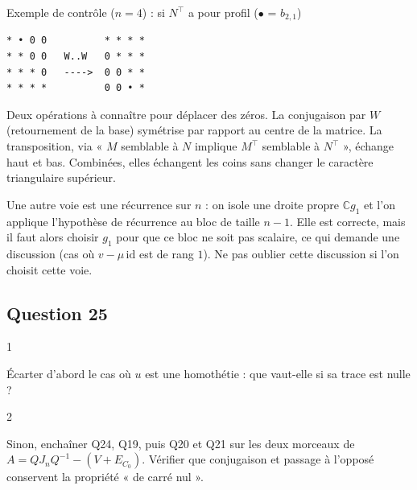 \documentclass[11pt,a4paper]{article}
\begin{document}
Exemple de contrôle (\(n=4\)) : si \(N^\top\) a pour profil (\(\bullet\) = \(b_{2,1}\))

\begin{lstlisting}
* • 0 0          * * * *
* * 0 0   W..W   0 * * *
* * * 0   ---->  0 0 * *
* * * *          0 0 • *
\end{lstlisting}

\begin{methode}

Deux opérations à connaître pour déplacer des zéros. La conjugaison par \(W\) (retournement de la base) symétrise par rapport au centre de la matrice. La transposition, via « \(M\) semblable à \(N\) implique \(M^\top\) semblable à \(N^\top\) », échange haut et bas. Combinées, elles échangent les coins sans changer le caractère triangulaire supérieur.

\end{methode}

\begin{piege}

Une autre voie est une récurrence sur \(n\) : on isole une droite propre \(\mathbb Cg_1\) et l'on applique l'hypothèse de récurrence au bloc de taille \(n-1\). Elle est correcte, mais il faut alors choisir \(g_1\) pour que ce bloc ne soit pas scalaire, ce qui demande une discussion (cas où \(v-\mu\,\mathrm{id}\) est de rang \(1\)). Ne pas oublier cette discussion si l'on choisit cette voie.

\end{piege}

\hypertarget{question-25}{%
\subsection{Question 25}\label{question-25}}

\begin{indication}{1}

Écarter d'abord le cas où \(u\) est une homothétie : que vaut-elle si sa trace est nulle ?

\end{indication}

\begin{indication}{2}

Sinon, enchaîner Q24, Q19, puis Q20 et Q21 sur les deux morceaux de \(A=QJ_nQ^{-1}-(V+E_{C_0})\). Vérifier que conjugaison et passage à l'opposé conservent la propriété « de carré nul ».

\end{indication}
\end{document}
